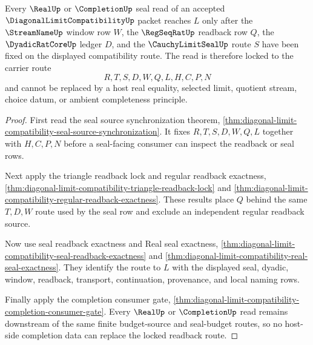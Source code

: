 \begin{theorem}
\label{thm:diagonal-limit-compatibility-root-real-seal-readback-lock}
Every $\RealUp$ or $\CompletionUp$ seal read of an accepted
$\DiagonalLimitCompatibilityUp$ packet reaches $L$ only after the
$\StreamNameUp$ window row $W$, the $\RegSeqRatUp$ readback row $Q$, the
$\DyadicRatCoreUp$ ledger $D$, and the $\CauchyLimitSealUp$ route $S$ have
been fixed on the displayed compatibility route. The read is therefore locked
to the carrier route
$$
R,T,S,D,W,Q,L,H,C,P,N
$$
and cannot be replaced by a host real equality, selected limit, quotient
stream, choice datum, or ambient completeness principle.
\end{theorem}
\begin{proof}
First read the seal source synchronization theorem,
\autoref{thm:diagonal-limit-compatibility-seal-source-synchronization}. It
fixes $R,T,S,D,W,Q,L$ together with $H,C,P,N$ before a seal-facing consumer
can inspect the readback or seal rows.

Next apply the triangle readback lock and regular readback exactness,
\autoref{thm:diagonal-limit-compatibility-triangle-readback-lock} and
\autoref{thm:diagonal-limit-compatibility-regular-readback-exactness}. These
results place $Q$ behind the same $T,D,W$ route used by the seal row and
exclude an independent regular readback source.

Now use seal readback exactness and Real seal exactness,
\autoref{thm:diagonal-limit-compatibility-seal-readback-exactness} and
\autoref{thm:diagonal-limit-compatibility-real-seal-exactness}. They identify
the route to $L$ with the displayed seal, dyadic, window, readback, transport,
continuation, provenance, and local naming rows.

Finally apply the completion consumer gate,
\autoref{thm:diagonal-limit-compatibility-completion-consumer-gate}. Every
$\RealUp$ or $\CompletionUp$ read remains downstream of the same finite
budget-source and seal-budget routes, so no host-side completion data can
replace the locked readback route.
\end{proof}

